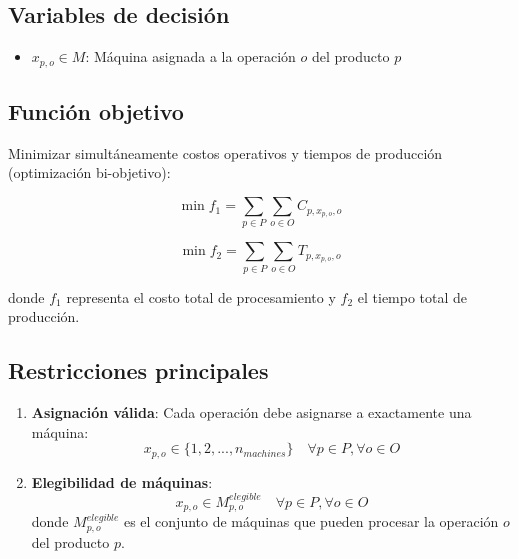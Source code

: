 \documentclass[preprint,12pt,authoryear]{elsarticle}
\begin{document}
\subsection{Variables de decisión}
\begin{itemize}[leftmargin=1.5cm]
    \item $x_{p,o} \in M$: Máquina asignada a la operación $o$ del producto $p$
\end{itemize}

\subsection{Función objetivo}
Minimizar simultáneamente costos operativos y tiempos de producción (optimización bi-objetivo):

\begin{equation}
\min f_1 = \sum_{p \in P} \sum_{o \in O} C_{p,x_{p,o},o}
\end{equation}

\begin{equation}
\min f_2 = \sum_{p \in P} \sum_{o \in O} T_{p,x_{p,o},o}
\end{equation}

donde $f_1$ representa el costo total de procesamiento y $f_2$ el tiempo total de producción.

\subsection{Restricciones principales}
\begin{enumerate}
    \item \textbf{Asignación válida}: Cada operación debe asignarse a exactamente una máquina:
    \begin{equation}
    x_{p,o} \in \{1, 2, ..., n_{machines}\} \quad \forall p \in P, \forall o \in O
    \end{equation}
    
    \item \textbf{Elegibilidad de máquinas}: 
    \begin{equation}
    x_{p,o} \in M_{p,o}^{elegible} \quad \forall p \in P, \forall o \in O
    \end{equation}
    donde $M_{p,o}^{elegible}$ es el conjunto de máquinas que pueden procesar la operación $o$ del producto $p$.
\end{enumerate}
\end{document}
